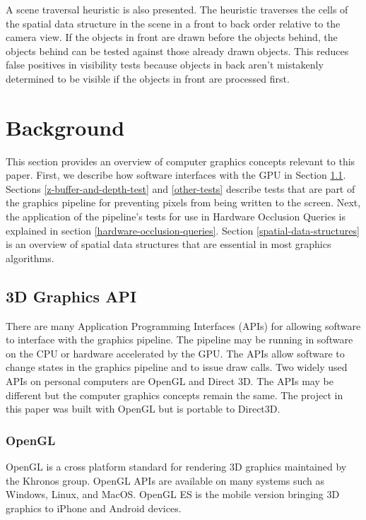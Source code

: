 \documentclass[12pt]{ucthesis}
\begin{document}
A scene traversal heuristic is also presented.
The heuristic traverses the cells of the spatial data structure in the scene in a front to back order relative to the camera view.
If the objects in front are drawn before the objects behind, the objects behind can be tested against those already drawn objects.
This reduces false positives in visibility tests because objects in back aren't mistakenly determined to be visible if the objects in front are processed first.

\chapter{Background}
\label{background}

This section provides an overview of computer graphics concepts relevant to this paper.
First, we describe how software interfaces with the GPU in Section \ref{3d-graphics-api}.
Sections \ref{z-buffer-and-depth-test} and \ref{other-tests} describe tests that are part of the graphics pipeline for preventing pixels from being written to the screen.
Next, the application of the pipeline's tests for use in Hardware Occlusion Queries is explained in section \ref{hardware-occlusion-queries}.
Section \ref{spatial-data-structures} is an overview of spatial data structures that are essential in most graphics algorithms.

\section{3D Graphics API}
\label{3d-graphics-api}

There are many Application Programming Interfaces (APIs) for allowing software to interface with the graphics pipeline.
The pipeline may be running in software on the CPU or hardware accelerated by the GPU.
The APIs allow software to change states in the graphics pipeline and to issue draw calls.
Two widely used APIs on personal computers are OpenGL and Direct 3D.\cite{about-openGL, about-direct3D}
The APIs may be different but the computer graphics concepts remain the same.
The project in this paper was built with OpenGL but is portable to Direct3D.

\subsection{OpenGL}
\label{openGl}

OpenGL is a cross platform standard for rendering 3D graphics maintained by the Khronos group.\cite{about-openGL}
OpenGL APIs are available on many systems such as Windows, Linux, and MacOS.
OpenGL ES is the mobile version bringing 3D graphics to iPhone and Android devices.\cite{ios-glEs, android-glEs}
\end{document}
